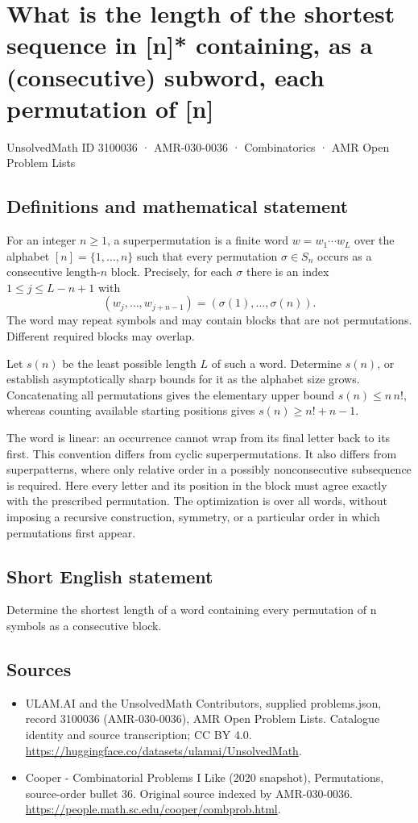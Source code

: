 \documentclass[11pt,a4paper]{article}
\begin{document}
\section*{What is the length of the shortest sequence in [n]* containing, as a (consecutive) subword, each permutation of [n]}\label{3100036}
{\small UnsolvedMath ID 3100036 · AMR-030-0036 · Combinatorics · AMR Open Problem Lists}
\subsection{Definitions and mathematical statement}
For an integer $n\ge1$, a superpermutation is a finite word
$w=w_1\cdots w_L$ over the alphabet $[n]=\{1,\ldots,n\}$ such
that every permutation $\sigma\in S_n$ occurs as a consecutive
length-$n$ block. Precisely, for each $\sigma$ there is an index
$1\le j\le L-n+1$ with
\[
                  (w_j,\ldots,w_{j+n-1})
                        =(\sigma(1),\ldots,\sigma(n)).
\]
The word may repeat symbols and may contain blocks that are not
permutations. Different required blocks may overlap.

Let $s(n)$ be the least possible length $L$ of such a word.
Determine $s(n)$, or establish asymptotically sharp bounds for it
as the alphabet size grows. Concatenating all permutations gives
the elementary upper bound $s(n)\le n\,n!$, whereas counting
available starting positions gives $s(n)\ge n!+n-1$.

The word is linear: an occurrence cannot wrap from its final
letter back to its first. This convention differs from cyclic
superpermutations. It also differs from superpatterns, where only
relative order in a possibly nonconsecutive subsequence is
required. Here every letter and its position in the block must
agree exactly with the prescribed permutation. The optimization
is over all words, without imposing a recursive construction,
symmetry, or a particular order in which permutations first appear.
\subsection{Short English statement}
Determine the shortest length of a word containing every permutation of n symbols as a consecutive block.
\subsection{Sources}
\begin{itemize}
\item[S1] ULAM.AI and the UnsolvedMath Contributors, supplied problems.json, record 3100036 (AMR-030-0036), AMR Open Problem Lists. Catalogue identity and source transcription; CC BY 4.0.
\url{https://huggingface.co/datasets/ulamai/UnsolvedMath}.
\item[S2] Cooper - Combinatorial Problems I Like (2020 snapshot), Permutations, source-order bullet 36. Original source indexed by AMR-030-0036.
\url{https://people.math.sc.edu/cooper/combprob.html}.
\end{itemize}
\end{document}
